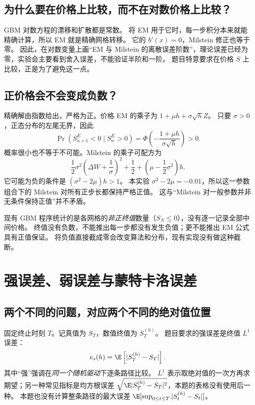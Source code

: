 \subsection{为什么要在价格上比较，而不在对数价格上比较？}
GBM 对数方程的漂移和扩散都是常数。
将 EM 用于它时，每一步积分本来就能精确计算，所以 EM 就是精确网格转移。
它的 $b'(x)=0$，Milstein 修正也等于零。
因此，在对数变量上画“EM 与 Milstein 的离散误差阶数”，理论误差已经为零，实验会主要看到舍入误差，不能验证半阶和一阶。
题目特意要求在价格 $S$ 上比较，正是为了避免这一点。

\subsection{正价格会不会变成负数？}
精确解由指数给出，严格为正。价格 EM 的乘子为 $1+\mu h+\sigma\sqrt h Z$。
只要 $\sigma>0$，正态分布的左尾无界，因此
\begin{equation}\label{eq:methods-em-negative}
 \Pr(S_{n+1}^{E}<0\mid S_n^{E}>0)
 =\Phi\left(-\frac{1+\mu h}{\sigma\sqrt h}\right)>0.
\end{equation}
概率很小也不等于不可能。Milstein 的乘子可配方为
\begin{equation}\label{eq:methods-mil-positive}
 \frac12\sigma^2\left(\Delta W+\frac1\sigma\right)^2
 +\frac12+\left(\mu-\frac12\sigma^2\right)h.
\end{equation}
它可能为负的条件是 $(\sigma^2-2\mu)h>1$。
本实验 $\sigma^2-2\mu=-0.01$，所以这一参数组合下的 Milstein 对所有正步长都保持严格正值。
这与“Milstein 对一般参数并非无条件保持正值”并不矛盾。

现有 GBM 程序统计的是各网格的\emph{非正终值}数量（$S_N\le0$），没有逐一记录全部中间价格。
终值没有负数，不能推出每一步都没有发生负值；更不能推出 EM 公式具有正值保证。
将负值直接截成零会改变算法和分布，现有实现没有做这种截断。

\section{强误差、弱误差与蒙特卡洛误差}\label{sec:errors}
\subsection{两个不同的问题，对应两个不同的绝对值位置}
固定终止时刻 $T$。记真值为 $S_T$，数值终值为 $S_T^{(h)}$。
题目要求的强误差是终值 $L^1$ 误差：
\begin{equation}\label{eq:errors-strong}
 e_s(h)=\E\left[|S_T^{(h)}-S_T|\right].
\end{equation}
其中“强”强调在\emph{同一个随机驱动}下逐条路径比较。
$L^1$ 表示取绝对值的一次方再求期望；另一种常见指标是均方根误差 $\sqrt{\E|S_T^{(h)}-S_T|^2}$，本题的表格没有使用后一种。
本题也没有计算整条路径的最大误差 $\E[\sup_{0\le t\le T}|S_t^{(h)}-S_t|]$。

